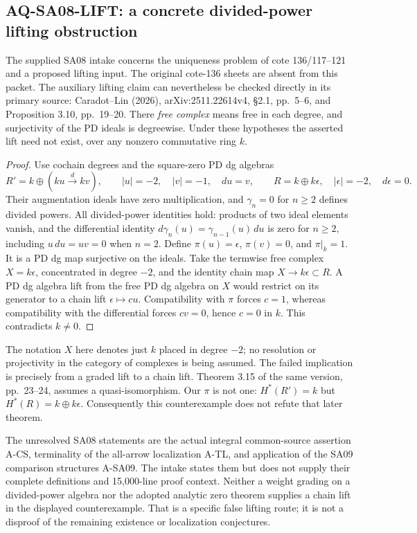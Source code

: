 \subsection{AQ-SA08-LIFT: a concrete divided-power lifting obstruction}
The supplied SA08 intake concerns the uniqueness problem
of cote 136/117--121 and a proposed lifting input.
The original cote-136 sheets are absent from this packet.
The auxiliary lifting claim can nevertheless be checked
directly in its primary source: Caradot--Lin (2026),
arXiv:2511.22614v4, \S2.1, pp.~5--6, and
Proposition 3.10, pp.~19--20.
There \emph{free complex} means free in each degree,
and surjectivity of the PD ideals is degreewise.
Under these hypotheses the asserted lift need not exist,
over any nonzero commutative ring $k$.
\begin{proof}
Use cochain degrees and the square-zero PD dg algebras
\[
 R'=k\oplus(ku\xrightarrow{\,d\,}kv),\qquad
 |u|=-2,\quad |v|=-1,\quad du=v,
 \qquad R=k\oplus k\epsilon,\quad|\epsilon|=-2,\quad d\epsilon=0.
\]
Their augmentation ideals have zero multiplication,
and $\gamma_n=0$ for $n\geq2$ defines divided powers.
All divided-power identities hold: products of two
ideal elements vanish, and the differential identity
$d\gamma_n(u)=\gamma_{n-1}(u)\,du$ is zero for $n\geq2$,
including $u\,du=uv=0$ when $n=2$.
Define $\pi(u)=\epsilon$, $\pi(v)=0$, and $\pi|_k=1$.
It is a PD dg map surjective on the ideals.
Take the termwise free complex $X=k\epsilon$,
concentrated in degree $-2$, and the identity chain
map $X\to k\epsilon\subset R$.
A PD dg algebra lift from the free PD dg algebra
on $X$ would restrict on its generator to a chain
lift $\epsilon\mapsto cu$.
Compatibility with $\pi$ forces $c=1$, whereas
compatibility with the differential forces $cv=0$,
hence $c=0$ in $k$. This contradicts $k\ne0$.
\end{proof}
The notation $X$ here denotes just $k$ placed in
degree $-2$; no resolution or projectivity in the
category of complexes is being assumed.
The failed implication is precisely from a graded
lift to a chain lift. Theorem 3.15 of the same
version, pp.~23--24, assumes a quasi-isomorphism.
Our $\pi$ is not one:
$H^*(R')=k$ but $H^*(R)=k\oplus k\epsilon$.
Consequently this counterexample does not refute
that later theorem.

The unresolved SA08 statements are the actual
integral common-source assertion A-CS, terminality
of the all-arrow localization A-TL, and application
of the SA09 comparison structures A-SA09.
The intake states them but does not supply their
complete definitions and 15,000-line proof context.
Neither a weight grading on a divided-power algebra
nor the adopted analytic zero theorem supplies a
chain lift in the displayed counterexample.
That is a specific false lifting route; it is not
a disproof of the remaining existence or
localization conjectures.


